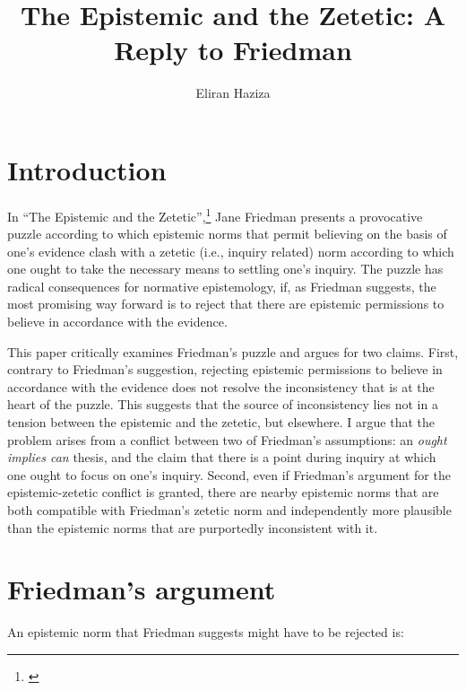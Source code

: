 \documentclass[12pt]{article}
\title{The Epistemic and the Zetetic: A Reply to Friedman}
\author{Eliran Haziza}
\begin{document}
\maketitle

\section{Introduction}

In ``The Epistemic and the Zetetic'',\footnote{\textcite{friedman_epistemic_nodate}} Jane Friedman presents a provocative puzzle according to which epistemic norms that permit believing on the basis of one's evidence clash with a zetetic (i.e., inquiry related) norm according to which one ought to take the necessary means to settling one's inquiry. The puzzle has radical consequences for normative epistemology, if, as Friedman suggests, the most promising way forward is to reject that there are epistemic permissions to believe in accordance with the evidence.

This paper critically examines Friedman's puzzle and argues for two claims. First, contrary to Friedman's suggestion, rejecting epistemic permissions to believe in accordance with the evidence does not resolve the inconsistency that is at the heart of the puzzle. This suggests that the source of inconsistency lies not in a tension between the epistemic and the zetetic, but elsewhere. I argue that the problem arises from a conflict between two of Friedman's assumptions: an \textit{ought implies can} thesis, and the claim that there is a point during inquiry at which one ought to focus on one's inquiry. Second, even if Friedman's argument for the epistemic-zetetic conflict is granted, there are nearby epistemic norms that are both compatible with Friedman's zetetic norm and independently more plausible than the epistemic norms that are purportedly inconsistent with it.

\section{Friedman's argument}\label{sec:2}

An epistemic norm that Friedman suggests might have to be rejected is:
\end{document}
